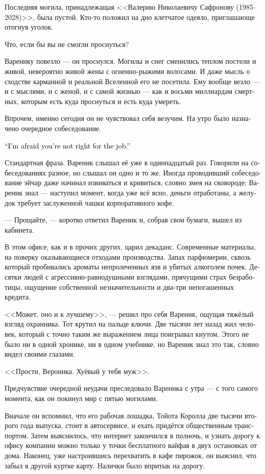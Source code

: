 \documentclass[a5paper,12pt,fleqn]{extbook}\usepackage{cooltooltips}\usepackage{polyglossia}\setdefaultlanguage[babelshorthands=true]{russian}\setotherlanguage{english}\defaultfontfeatures{Ligatures=TeX,Mapping=tex-text} \usepackage{xcolor}\definecolor{lightgray}{HTML}{bbbbbb}\color{lightgray}\newcommand{\ml}[3]{\textenglish{\textcolor{black}{#3}}}
\newcommand{\asterism}{\vspace{1em}{\centering\Large\bfseries$\ast~\ast~\ast$\par}\vspace{1em}}
\begin{document}
Последняя могила, принадлежащая <<Валерию Николаевичу Сафронову (1985--2028)>>, была пустой.
Кто-то положил на дно клетчатое одеяло, приглашающе отогнув уголок.

Что, если бы вы не смогли проснуться?

Варенику повезло --- он проснулся.
Могилы и снег сменились теплом постели и живой, невероятно живой жены с огненно-рыжими волосами.
И даже мысль о сходстве карманной и реальной Вселенной его не посетила.
Ему вообще везло --- и с мыслями, и с женой, и с самой жизнью --- как и восьми миллиардам смертных, которым есть куда проснуться и есть куда умереть.

Впрочем, именно сегодня он не чувствовал себя везучим.
На утро было назначено очередное собеседование.

\asterism

\ml{$0$}
{--- Извините, вы нам не подходите.}
{``I'm afraid you're not right for the job.''}

Стандартная фраза.
Вареник слышал её уже в одиннадцатый раз.
Говорили на собеседованиях разное, но слышал он одно и то же.
Иногда проводивший собеседование эйчар даже начинал извиваться и кривиться, словно змея на сковороде;
Вареник знал --- наступил момент, когда уже всё ясно, деньги отработаны, а желудок требует заслуженной чашки корпоративного кофе.

--- Прощайте, --- коротко ответил Вареник и, собрав свои бумаги, вышел из кабинета.

В этом офисе, как и в прочих других, царил декаданс.
Современные материалы, на поверку оказывающиеся отходами производства.
Запах парфюмерии, сквозь который пробивались ароматы непролеченных язв и убитых алкоголем почек.
Десятки людей с агрессивно-равнодушными взглядами, прячущими страх безработицы, ощущение собственной незначительности и два-три непогашенных кредита.

<<Может, оно и к лучшему>>, --- решил про себя Вареник, ощущая тяжёлый взгляд охранника.
Тот крутил на пальце ключи.
Две тысячи лет назад жил человек, который с точно таким же выражением лица поигрывал кнутом.
Этого не было ни в одной хронике, ни в одном учебнике, но Вареник знал это так, словно видел своими глазами.

<<Прости, Вероника.
Хуёвый у тебя муж>>.

\asterism

Предчувствие очередной неудачи преследовало Вареника с утра --- с того самого момента, как он покинул мир с пятью могилами.

Вначале он вспомнил, что его рабочая лошадка, Тойота Королла две тысячи второго года выпуска, стоит в автосервисе, и ехать придётся общественным транспортом.
Затем выяснилось, что интернет закончился в полночь, и узнать дорогу к офису компании можно только у точки бесплатного вайфая в двух остановках от дома.
Наконец, уже настроившись перехватить в кафе пирожок, он выяснил, что забыл в другой куртке карту.
Налички было впритык на дорогу.
\end{document}
